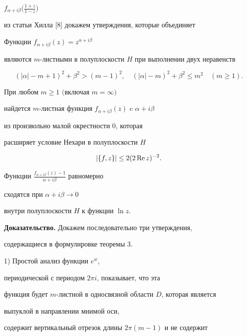 $f_{\alpha+i\beta}\big(\frac{1+z}{1-z}\big)$ 


из статьи Хилла [8] докажем утверждения, которые объединяет 


 


\begin{thm} 


Функции $f_{\alpha+i\beta}(z)=z^{\alpha+i\beta}$ 


являются $m$-листными в полуплоскости $H$ при выполнении двух неравенств 


$$ 


(|\alpha|-m+1)^2+\beta^2>(m-1)^2,\quad 


(|\alpha|-m)^2+\beta^2\le m^2\quad (m\ge 1). 


$$ 


При любом $m\ge 1$ $($включая $m=\infty)$


найдется $m$-листная функция $f_{\alpha+i\beta}(z)$ c $\alpha+i\beta$


из произвольно малой окрестности $0$, которая 


расширяет условие Нехари в полуплоскости $H$ 


\begin{equation} 


|\{f,z\}|\le 2(2\re z)^{-2}. 


\end{equation} 


Функции $\frac{f_{\alpha+i\beta}(z)-1}{\alpha+i\beta}$ равномерно 


сходятся при $\alpha+i\beta\to 0$ 


внутри полуплоскости $H$ к функции $\ln z$. 


\end{thm} 


 


{\bf Доказательство.} Докажем последовательно три утверждения, 


содержащиеся в формулировке теоремы 3. 


 


1) Простой анализ функции $e^w$, 


периодической с периодом $2\pi i$, показывает, что эта 


функция будет $m$-листной в односвязной области $D$, которая является 


выпуклой в направлении мнимой оси, 


содержит вертикальный отрезок длины $2\pi(m-1)$ и не содержит 


